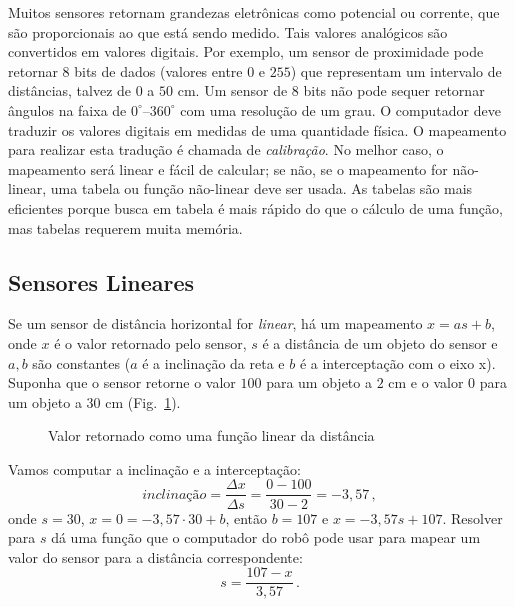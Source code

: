 Muitos sensores retornam grandezas eletrônicas como potencial ou corrente, que são proporcionais ao que está sendo medido. Tais valores analógicos são convertidos em valores digitais. Por exemplo, um sensor de proximidade pode retornar $8$ bits de dados (valores entre $0$ e $255$) que representam um intervalo de distâncias, talvez de $0$ a $50$ cm. Um sensor de $8$ bits não pode sequer retornar ângulos na faixa de $0^{\circ}$--$360^{\circ}$ com uma resolução de um grau. O computador deve traduzir os valores digitais em medidas de uma quantidade física. O mapeamento para realizar esta tradução é chamada de \emph{calibração}. No melhor caso, o mapeamento será linear e fácil de calcular; se não, se o mapeamento for não-linear, uma tabela ou função não-linear deve ser usada. As tabelas são mais eficientes porque busca em tabela é mais rápido do que o cálculo de uma função, mas tabelas requerem muita memória.

\subsection{Sensores Lineares}

Se um sensor de distância horizontal for \emph{linear}, há um mapeamento $x = a s + b$, onde $x$ é o valor retornado pelo sensor, $s$ é a distância de um objeto do sensor e $a,b$ são constantes ($a$ é a inclinação da reta e $b$ é a interceptação com o eixo x). Suponha que o sensor retorne o valor $100$ para um objeto a $2$ cm e o valor $0$ para um objeto a $30$ cm (Fig.~\ref{fig.linear}).

\begin{figure}
\begin{center}
\caption{Valor retornado como uma função linear da distância}\label{fig.linear}
\end{center}
\end{figure}

Vamos computar a inclinação e a interceptação:
\[
\textit{inclinação} = \frac{\Delta x}{\Delta s} = \frac{0-100}{30-2}=-3,\!57\,,
\]
onde $s=30$, $x=0=-3,\!57\cdot 30+b$, então $b=107$ e $x = -3,\!57 s + 107$. Resolver para $s$ dá uma função que o computador do robô pode usar para mapear um valor do sensor para a distância correspondente:
\[
s = \frac{107-x}{3,\!57}\,.
\]

